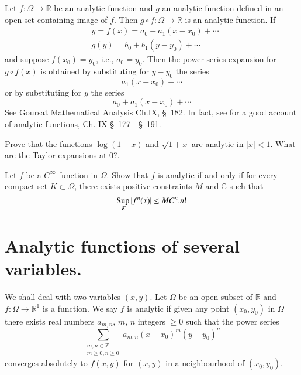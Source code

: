 Let $f:\Omega \to \mathbb{R}$ be an analytic function and $g$ an analytic function defined in an open set containing image of $f$. Then $g\circ f:\Omega \to \mathbb{R}$ is an analytic function. If
\begin{align*}
& y = f(x)=a_{0}+a_{1}(x-x_{0})+\cdots\\
& g(y)=b_{0}+b_{1}(y-y_{0})+\cdots
\end{align*}
and suppose $f(x_{0})=y_{0}$, i.e., $a_{0}=y_{0}$. Then the power series expansion for $g\circ f(x)$ is obtained by substituting for $y-y_{0}$ the series
$$
a_{1}(x-x_{0})+\cdots
$$
or by substituting for $y$ the series
$$
a_{0}+a_{1}(x-x_{0})+\cdots
$$
See Goursat Mathematical Analysis Ch.IX, \S\ 182. In fact, see for a good account of analytic functions, Ch. IX \S\ 177 - \S\ 191.

\begin{exer*}
Prove that the functions $\log (1-x)$ and $\sqrt{1+x}$ are analytic in $|x|<1$. What are the Taylor expansions at 0?.
\end{exer*}

\begin{exer*}
Let $f$ be a $C^{\infty}$ function in $\Omega$. Show that $f$ is analytic if and only if for every compact set $K\subset \Omega$, there exists positive constraints $M$ and $\mathbb{C}$ such that
$$
\displaystyle{\mathop{\text{Sup\,}}\limits_{K}}|f^{n}(x)|\leq MC^{n}.n!
$$
\end{exer*}

\section*{Analytic functions of several variables.}

We shall deal with two variables $(x,y)$. Let $\Omega$ be an open subset of $\mathbb{R}$ and $f:\Omega\to \mathbb{R}^{1}$ is a function. We say $f$ is analytic if given any point $(x_{0},y_{0})$ in $\Omega$ there exists real numbers $a_{m,n}$, $m$, $n$ integers $\geq 0$ such that the power series
$$
\sum\limits_{\substack{m,n\in \mathbb{Z}\\ m\geq 0, n\geq 0}}a_{m,n}(x-x_{0})^{m}(y-y_{0})^{n}
$$\pageoriginale
converges absolutely to $f(x,y)$ for $(x,y)$ in a neighbourhood of $(x_{0},y_{0})$. 

